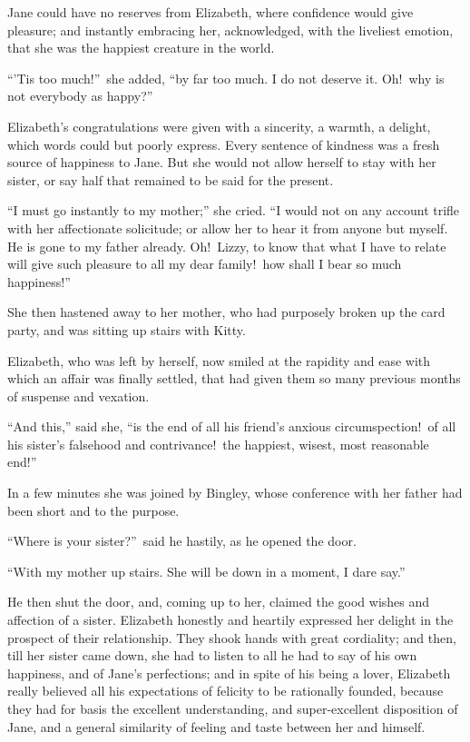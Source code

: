 \documentclass[12pt,english]{book}
\begin{document}
Jane could have no reserves from Elizabeth, where confidence would
give pleasure; and instantly embracing her, acknowledged, with the
liveliest emotion, that she was the happiest creature in the world.

{}``'Tis too much!''\ she added, {}``by far too much. I do not
deserve it. Oh!\ why is not everybody as happy?''\ 

Elizabeth's congratulations were given with a sincerity, a warmth,
a delight, which words could but poorly express. Every sentence of
kindness was a fresh source of happiness to Jane. But she would not
allow herself to stay with her sister, or say half that remained to
be said for the present.

{}``I must go instantly to my mother;'' she cried. {}``I would
not on any account trifle with her affectionate solicitude; or allow
her to hear it from anyone but myself. He is gone to my father already.
Oh!\ Lizzy, to know that what I have to relate will give such pleasure
to all my dear family!\ how shall I bear so much happiness!''\ 

She then hastened away to her mother, who had purposely broken up
the card party, and was sitting up stairs with Kitty.

Elizabeth, who was left by herself, now smiled at the rapidity and
ease with which an affair was finally settled, that had given them
so many previous months of suspense and vexation.

{}``And this,'' said she, {}``is the end of all his friend's anxious
circumspection!\ of all his sister's falsehood and contrivance!\ the
happiest, wisest, most reasonable end!''\ 

In a few minutes she was joined by Bingley, whose conference with
her father had been short and to the purpose.

{}``Where is your sister?''\ said he hastily, as he opened the
door.

{}``With my mother up stairs. She will be down in a moment, I dare
say.''

He then shut the door, and, coming up to her, claimed the good wishes
and affection of a sister. Elizabeth honestly and heartily expressed
her delight in the prospect of their relationship. They shook hands
with great cordiality; and then, till her sister came down, she had
to listen to all he had to say of his own happiness, and of Jane's
perfections; and in spite of his being a lover, Elizabeth really believed
all his expectations of felicity to be rationally founded, because
they had for basis the excellent understanding, and super-excellent
disposition of Jane, and a general similarity of feeling and taste
between her and himself.
\end{document}
